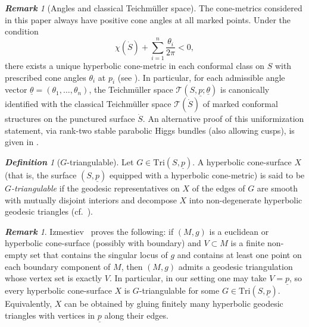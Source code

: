 \documentclass[11pt, letterpaper]{amsart}
\theoremstyle{definition}
\theoremstyle{remark}
\newtheorem{definition}[theorem]{\rm\bf Definition}
\newtheorem{remark}[theorem]{\rm\bf Remark}
\newcommand{\up}{\underline{p}}
\newcommand{\Sp}{(S,\up)}
\newcommand{\TSp}{\text{Tri}\Sp}
\newcommand{\cT}{\mathcal{T}}
\newcommand{\DEF}{} \newcommand{\WARN}{\textcolor{red}} \newcommand{\ALT}{\textcolor{brown}} \newcommand{\TODO}{\textcolor{teal}} %
\numberwithin{equation}{section}
\begin{document}
\begin{remark}[Angles and classical Teichm\"uller space]
\label{rmk:ang.class.Teich.space}
The cone-metrics considered in this paper always have positive cone angles at all
marked points.  Under the condition
\[
\chi(\dot S) + \sum_{i=1}^n\frac{\theta_i}{2\pi} < 0,
\]
there exists a unique hyperbolic cone-metric in each conformal class on $S$
with prescribed cone angles $\theta_i$ at $p_i$
(see \cite{Hei62,McO88,Tro91}).  In particular, for each admissible angle vector
$\underline{\theta} = (\theta_1,\dots,\theta_n)$, the Teichm\"uller space
$\cT(S,\up;\underline{\theta})$ is canonically identified with the classical
Teichm\"uller space $\cT(\dot S)$ of marked conformal structures on the punctured
surface $\dot S$.  An alternative proof of this uniformization statement, via
rank-two stable parabolic Higgs bundles (also allowing cusps), is given in
\cite{FX25}.
\end{remark}

\begin{definition}[$G$-triangulable]
Let $G\in \TSp$. A hyperbolic cone-surface $X$ (that is, the surface $\Sp$
equipped with a hyperbolic cone-metric) is said to be \DEF{\em $G$-triangulable} if
the geodesic representatives on $X$ of the edges of $G$ are smooth with mutually
disjoint interiors and decompose $X$ into non-degenerate hyperbolic geodesic
triangles (cf.~\cite[Sec.~2]{Pro25}).  
\end{definition}



\begin{remark}\label{rem:GB.and.triang}
Izmestiev~\cite[Prop.~4]{Izm15} proves the following: if \((M,g)\) is a euclidean or hyperbolic cone-surface (possibly with boundary) and \(V\subset M\) is a finite non-empty set that contains the singular locus of $g$ and contains at least one point on each boundary component of $M$, then \((M,g)\) admits a geodesic triangulation whose vertex set is exactly \(V\).
In particular, in our setting one may take \(V=\underline p\), so every hyperbolic cone-surface \(X\) is \(G\)-triangulable for some \(G\in\TSp\).
Equivalently, \(X\) can be obtained by gluing finitely many hyperbolic geodesic triangles with vertices in \(\underline p\) along their edges.
\end{remark}
\end{document}
